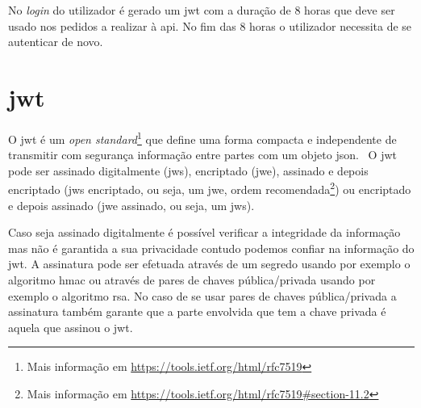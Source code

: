 No \textit{login} do utilizador é gerado um \acrshort{jwt} com a duração de 8 horas que deve ser usado nos pedidos a realizar à \acrshort{api}. No fim das 8 horas o utilizador necessita de se autenticar de novo.






\section{\acrfull{jwt}}
O \acrshort{jwt} é um \textit{open standard}\footnote{Mais informação em \url{https://tools.ietf.org/html/rfc7519}} que define uma forma compacta e independente de transmitir com segurança informação entre partes com um objeto \acrshort{json}.~\cite{jwtio} O \acrshort{jwt} pode ser assinado digitalmente (\acrshort{jws}), encriptado (\acrshort{jwe}), assinado e depois encriptado (\acrshort{jws} encriptado, ou seja, um \acrshort{jwe}, ordem recomendada\footnote{Mais informação em \url{https://tools.ietf.org/html/rfc7519\#section-11.2}}) ou encriptado e depois assinado (\acrshort{jwe} assinado, ou seja, um \acrshort{jws}).

Caso seja assinado digitalmente é possível verificar a integridade da informação mas não é garantida a sua privacidade contudo podemos confiar na informação do \acrshort{jwt}. A assinatura pode ser efetuada através de um segredo usando por exemplo o algoritmo \acrshort{hmac} ou através de pares de chaves pública/privada usando por exemplo o algoritmo \acrshort{rsa}. No caso de se usar pares de chaves pública/privada a assinatura também garante que a parte envolvida que tem a chave privada é aquela que assinou o \acrshort{jwt}.


